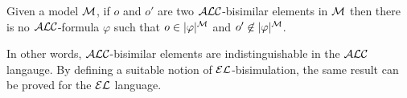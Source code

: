 \begin{theorem}
Given a model $\mathcal{M}$, if  $o$ and $o'$ are two $\mathcal{ALC}$-bisimilar elements in $\mathcal{M}$
then there is no $\mathcal{ALC}$-formula $\varphi$ such that $o \in |\varphi|^{\mathcal{M}}$ and
$o' \not \in |\varphi|^{\mathcal{M}}$.
\end{theorem}

In other words, $\mathcal{ALC}$-bisimilar elements are indistinguishable in the $\mathcal{ALC}$ langauge.
By defining a suitable notion of $\mathcal{EL}$-bisimulation, the same result can be proved for
the $\mathcal{EL}$ language. 



\cite{dovier04:_effic_algor_for_comput_bisim_equiv}

